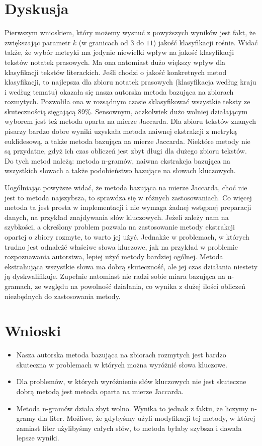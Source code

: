 \documentclass[a4paper]{classrep}
\begin{document}
\section{Dyskusja}
Pierwszym wnioskiem, który możemy wysnuć z powyższych wyników jest fakt, że zwiększając parametr \(k\) (w granicach od \(3\) do \(11\)) jakość klasyfikacji rośnie. Widać także,
że wybór metryki ma jedynie niewielki wpływ na jakość klasyfikacji tekstów notatek prasowych. Ma ona natomiast dużo większy wpływ dla klasyfikacji tekstów literackich.
Jeśli chodzi o jakość konkretnych metod klasyfikacji, to najlepsza dla zbioru notatek prasowych (klasyfikacja według kraju i według tematu)
okazała się nasza autorska metoda bazująca na zbiorach rozmytych. Pozwoliła ona w rozsądnym czasie sklasyfikować wszystkie teksty ze skutecznością sięgającą 89\%. Sensownym, aczkolwiek
dużo wolniej działającym wyborem jest też metoda oparta na mierze Jaccarda.
Dla zbioru tekstów znanych pisarzy bardzo dobre wyniki uzyskała metoda naiwnej ekstrakcji z metryką euklidesową,
a także metoda bazująca na mierze Jaccarda. Niektóre metody nie są przydatne, gdyż ich czas obliczeń jest zbyt długi dla dużego zbioru tekstów. Do tych metod należą:
metoda n-gramów, naiwna ekstrakcja bazująca na wszystkich słowach a także podobieństwo bazujące na słowach kluczowych.

Uogólniając powyższe widać, że metoda bazująca na mierze Jaccarda, choć nie jest to metoda najszybsza, to sprawdza się w różnych zastosowaniach. Co więcej metoda ta jest
prosta w implementacji i nie wymaga żadnej wstępnej preparacji danych, na przykład znajdywania słów kluczowych. Jeżeli zależy nam na szybkości, a określony problem pozwala
na zastosowanie metody ekstrakcji opartej o zbiory rozmyte, to warto jej użyć. Jednakże w problemach, w których trudno jest odnaleźć właściwe słowa kluczowe, jak na przykład
w problemie rozpoznawania autorstwa, lepiej użyć metody bardziej ogólnej. Metoda ekstrahująca wszystkie słowa ma dobrą skuteczność, ale jej czas działania  niestety ją dyskwalifikuje.
Zupełnie natomiast nie radzi sobie miara bazująca na n-gramach, ze względu na powolność działania, co wynika z dużej ilości obliczeń niezbędnych do zastosowania metody. 
\section{Wnioski}
\begin{itemize}
\item Nasza autorska metoda bazująca na zbiorach rozmytych jest bardzo skuteczna w problemach w których można wyróżnić słowa kluczowe.
\item Dla problemów, w których wyróżnienie słów kluczowych nie jest skuteczne dobrą metodą jest metoda oparta na mierze Jaccarda.
\item Metoda n-gramów działa zbyt wolno. Wynika to jednak z faktu, że liczymy n-gramy dla liter. Możliwe, że gdybyśmy użyli modyfikacji tej metody, w której zamiast
liter użylibyśmy całych słów, to metoda byłaby szybsza i dawała lepsze wyniki.
\end{itemize}
\end{document}
